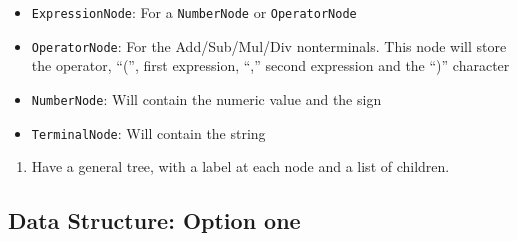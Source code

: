 \documentclass[
]{book}
\providecommand{\tightlist}{%
  \setlength{\itemsep}{0pt}\setlength{\parskip}{0pt}}
\begin{document}
\begin{itemize}
\tightlist
\item
  \texttt{ExpressionNode}: For a \texttt{NumberNode} or \texttt{OperatorNode}
\item
  \texttt{OperatorNode}: For the Add/Sub/Mul/Div nonterminals. This node will store the operator, ``('', first expression, ``,'' second expression and the ``)'' character
\item
  \texttt{NumberNode}: Will contain the numeric value and the sign
\item
  \texttt{TerminalNode}: Will contain the string
\end{itemize}

\begin{enumerate}
\def\labelenumi{\arabic{enumi}.}
\setcounter{enumi}{1}
\tightlist
\item
  Have a general tree, with a label at each node and a list of children.
\end{enumerate}

\hypertarget{data-structure-option-one}{%
\subsection{Data Structure: Option one}\label{data-structure-option-one}}
\end{document}

